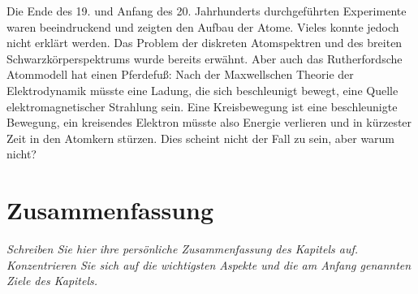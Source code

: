Die Ende des 19. und Anfang des 20. Jahrhunderts durchgeführten Experimente waren beeindruckend und zeigten den Aufbau der Atome. Vieles konnte jedoch nicht erklärt werden. Das Problem der diskreten Atomspektren und des breiten Schwarzkörperspektrums wurde bereits erwähnt. Aber auch das Rutherfordsche Atommodell hat einen Pferdefuß: Nach der Maxwellschen Theorie der Elektrodynamik müsste eine Ladung, die sich beschleunigt bewegt, eine Quelle elektromagnetischer Strahlung sein. Eine Kreisbewegung ist eine beschleunigte Bewegung, ein kreisendes Elektron müsste also Energie verlieren und in kürzester Zeit in den Atomkern stürzen. Dies scheint nicht der Fall zu sein, aber warum nicht?

\section{Zusammenfassung}

\textit{Schreiben Sie hier ihre persönliche Zusammenfassung des Kapitels auf. Konzentrieren Sie sich auf die wichtigsten Aspekte und die am Anfang genannten Ziele des Kapitels.}

\vspace*{10cm}




\printbibliography[segment=\therefsegment,heading=subbibliography]
